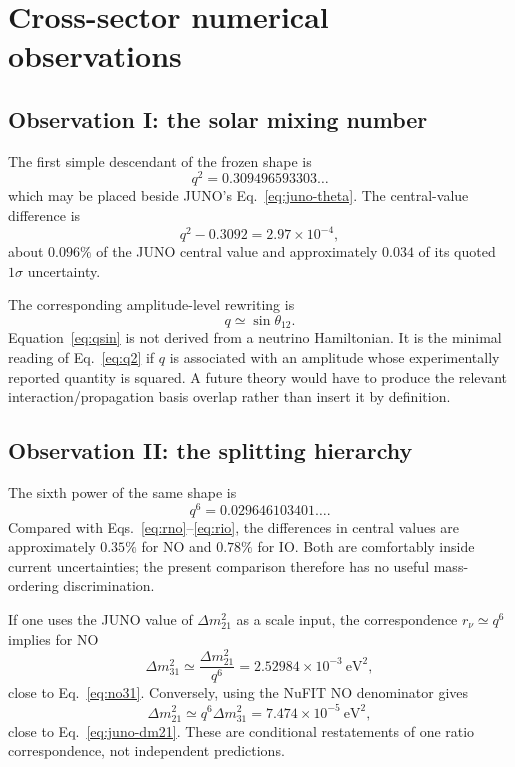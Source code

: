 \documentclass[10pt,twocolumn]{article}
\newcommand{\qsql}{0.309496593303}
\newcommand{\qsix}{0.029646103401}
\newcommand{\rnu}{r_{\nu}}
\begin{document}
\section{Cross-sector numerical observations}
\label{sec:numerics}

\subsection{Observation I: the solar mixing number}

The first simple descendant of the frozen shape is
\begin{equation}
\boxed{
q^2=\qsql\ldots
}
\label{eq:q2}
\end{equation}
which may be placed beside JUNO's
Eq.~\eqref{eq:juno-theta}.  The central-value difference is
\begin{equation}
q^2-0.3092
=2.97\times10^{-4},
\end{equation}
about $0.096\%$ of the JUNO central value and approximately
$0.034$ of its quoted $1\sigma$ uncertainty.

The corresponding amplitude-level rewriting is
\begin{equation}
q\simeq\sin\theta_{12}.
\label{eq:qsin}
\end{equation}
Equation~\eqref{eq:qsin} is not derived from a neutrino Hamiltonian.  It is the
minimal reading of Eq.~\eqref{eq:q2} if $q$ is associated with an amplitude whose
experimentally reported quantity is squared.  A future theory would have to
produce the relevant interaction/propagation basis overlap rather than insert it
by definition.

\subsection{Observation II: the splitting hierarchy}

The sixth power of the same shape is
\begin{equation}
\boxed{
q^6=\qsix\ldots .
}
\label{eq:q6}
\end{equation}
Compared with Eqs.~\eqref{eq:rno}--\eqref{eq:rio}, the differences in central
values are approximately $0.35\%$ for NO and $0.78\%$ for IO.  Both are comfortably
inside current uncertainties; the present comparison therefore has no useful
mass-ordering discrimination.

If one uses the JUNO value of $\Delta m^2_{21}$ as a scale input, the
correspondence $\rnu\simeq q^6$ implies for NO
\begin{equation}
\Delta m^2_{31}
\simeq
\frac{\Delta m^2_{21}}{q^6}
=
2.52984\times10^{-3}\ \mathrm{eV}^2,
\label{eq:conditional31}
\end{equation}
close to Eq.~\eqref{eq:no31}.  Conversely, using the NuFIT NO denominator gives
\begin{equation}
\Delta m^2_{21}
\simeq
q^6\Delta m^2_{31}
=
7.474\times10^{-5}\ \mathrm{eV}^2,
\label{eq:conditional21}
\end{equation}
close to Eq.~\eqref{eq:juno-dm21}.  These are conditional restatements of one
ratio correspondence, not independent predictions.
\end{document}

